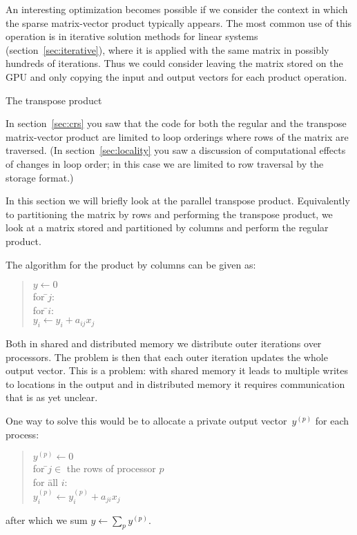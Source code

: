 An
interesting optimization becomes possible if we consider the context
in which the sparse matrix-vector product typically appears. The most
common use of this operation is in iterative solution methods for
linear systems (section~\ref{sec:iterative}), where it is applied with
the same matrix in possibly hundreds of iterations. Thus we could
consider leaving the matrix stored on the GPU and only copying the
input and output vectors for each product operation.


 {The transpose product}
\label{sec:shared-crs-transpose}

In section~\ref{sec:crs} you saw that the code for both the regular
and the transpose matrix-vector product are limited to loop orderings
where rows of the matrix are traversed. (In section~\ref{sec:locality}
you saw a discussion of computational effects of changes in loop
order; in this case we are limited to row traversal by the storage
format.) 

In this section we will briefly look at the parallel transpose
product. Equivalently to partitioning the matrix by rows and
performing the transpose product, we look at a matrix stored and
partitioned by columns and perform the regular product.

The  algorithm for the product by columns can be given as:
\begin{quote}
    \begin{tabbing}
      $y\leftarrow 0$\\
      for \=$j$:\\
      \> for \=$i$:\\
      \>\> $y_i\leftarrow y_i+a_{ij}x_j$
    \end{tabbing}
\end{quote}
Both in shared and distributed memory we distribute outer iterations
over processors. The problem is then that each outer iteration updates
the whole output vector. This is a problem: with shared memory it
leads to multiple writes to locations in the output and in distributed
memory it requires communication that is as yet unclear.

One way to solve this would be to allocate a private output
vector~$y^{(p)}$ for each process:
\begin{quote}
    \begin{tabbing}
      $y^{(p)}\leftarrow 0$\\
      for \=$j\in$ the rows of processor $p$\\
      \> for \=all $i$:\\
      \>\> $y^{(p)}_i\leftarrow y^{(p)}_i+a_{ji}x_j$
    \end{tabbing}
\end{quote}
after which we sum $y\leftarrow\sum_py^{(p)}$.

